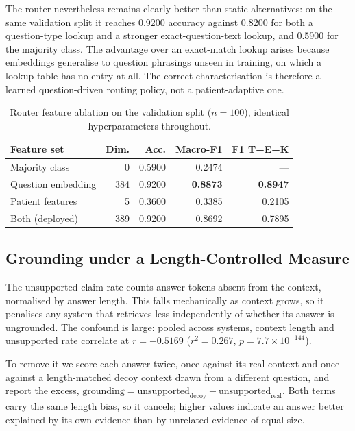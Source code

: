 \documentclass[preprint,12pt]{elsarticle}
\begin{document}
The router nevertheless remains clearly better than static
alternatives: on the same validation split it reaches 0.9200 accuracy
against 0.8200 for both a question-type lookup and a stronger
exact-question-text lookup, and 0.5900 for the majority class. The
advantage over an exact-match lookup arises because embeddings
generalise to question phrasings unseen in training, on which a lookup
table has no entry at all. The correct characterisation is therefore a
learned question-driven routing policy, not a patient-adaptive one.

\begin{table}[t]
\centering
\footnotesize
\setlength{\tabcolsep}{4pt}
\caption{Router feature ablation on the validation split ($n{=}100$), identical hyperparameters throughout.}
\label{tab:ablation}
\begin{tabular}{lrrrr}
\toprule
Feature set & Dim. & Acc. & Macro-F1 & F1 T+E+K \\
\midrule
Majority class     &   0 & 0.5900 & 0.2474 & --- \\
Question embedding & 384 & 0.9200 & \textbf{0.8873} & \textbf{0.8947} \\
Patient features   &   5 & 0.3600 & 0.3385 & 0.2105 \\
Both (deployed)    & 389 & 0.9200 & 0.8692 & 0.7895 \\
\bottomrule
\end{tabular}
\end{table}



\subsection{Grounding under a Length-Controlled Measure}
\label{sec:grounding}

The unsupported-claim rate counts answer tokens absent from the
context, normalised by answer length. This falls mechanically as
context grows, so it penalises any system that retrieves less
independently of whether its answer is ungrounded. The confound is
large: pooled across systems, context length and unsupported rate
correlate at $r = -0.5169$ ($r^2 = 0.267$,
$p = 7.7\times10^{-144}$).

To remove it we score each answer twice, once against its real context
and once against a length-matched decoy context drawn from a different
question, and report the excess,
$\text{grounding} = \text{unsupported}_{\text{decoy}} -
\text{unsupported}_{\text{real}}$. Both terms carry the same length
bias, so it cancels; higher values indicate an answer better explained
by its own evidence than by unrelated evidence of equal size.
\end{document}
